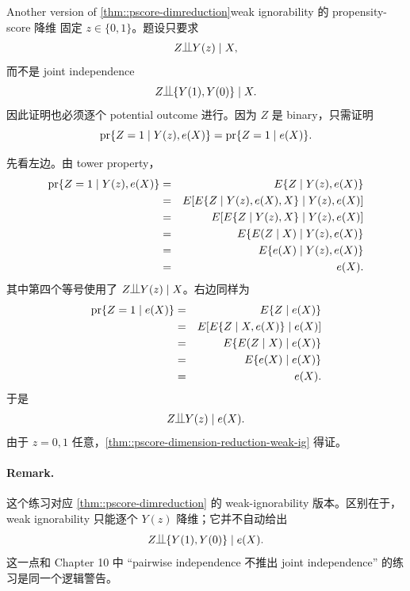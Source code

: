 \begin{exercisesolution}{Another version of \cref{thm::pscore-dimreduction}}{weak ignorability 的 propensity-score 降维}
固定 $z\in\{0,1\}$。题设只要求
\[
Z\ind Y(z)\mid X,
\]
而不是 joint independence
\[
Z\ind \{Y(1),Y(0)\}\mid X.
\]
因此证明也必须逐个 potential outcome 进行。因为 $Z$ 是 binary，只需证明
\[
\textup{pr}\{Z=1\mid Y(z),e(X)\}=\textup{pr}\{Z=1\mid e(X)\}.
\]

先看左边。由 tower property，
\begin{eqnarray*}
\textup{pr}\{Z=1\mid Y(z),e(X)\}
&=&E\{Z\mid Y(z),e(X)\}\\
&=&E[E\{Z\mid Y(z),e(X),X\}\mid Y(z),e(X)]\\
&=&E[E\{Z\mid Y(z),X\}\mid Y(z),e(X)]\\
&=&E\{E(Z\mid X)\mid Y(z),e(X)\}\\
&=&E\{e(X)\mid Y(z),e(X)\}\\
&=&e(X).
\end{eqnarray*}
其中第四个等号使用了 $Z\ind Y(z)\mid X$。右边同样为
\begin{eqnarray*}
\textup{pr}\{Z=1\mid e(X)\}
&=&E\{Z\mid e(X)\}\\
&=&E[E\{Z\mid X,e(X)\}\mid e(X)]\\
&=&E\{E(Z\mid X)\mid e(X)\}\\
&=&E\{e(X)\mid e(X)\}\\
&=&e(X).
\end{eqnarray*}
于是
\[
Z\ind Y(z)\mid e(X).
\]
由于 $z=0,1$ 任意，\cref{thm::pscore-dimension-reduction-weak-ig} 得证。

\paragraph{Remark.}
这个练习对应 \cref{thm::pscore-dimreduction} 的 weak-ignorability 版本。区别在于，weak ignorability 只能逐个 $Y(z)$ 降维；它并不自动给出
\[
Z\ind \{Y(1),Y(0)\}\mid e(X).
\]
这一点和 Chapter 10 中 ``pairwise independence 不推出 joint independence'' 的练习是同一个逻辑警告。
\end{exercisesolution}

